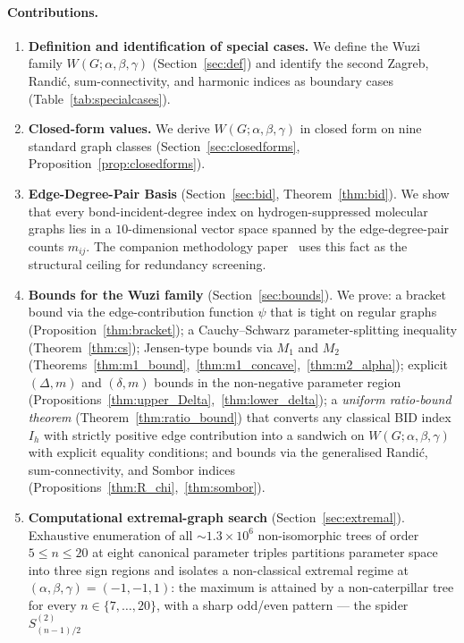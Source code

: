 \documentclass[11pt,a4paper]{article}
\theoremstyle{definition}
\newcommand{\Wuzi}{W(G;\alpha,\beta,\gamma)}
\begin{document}
\paragraph{Contributions.}
\begin{enumerate}[label=(\arabic*)]
\item \textbf{Definition and identification of special cases.}
We define the Wuzi family $\Wuzi$ (Section~\ref{sec:def}) and
identify the second Zagreb, Randi\'c, sum-connectivity, and harmonic
indices as boundary cases (Table~\ref{tab:specialcases}).
\item \textbf{Closed-form values.} We derive $\Wuzi$ in closed form
on nine standard graph classes (Section~\ref{sec:closedforms},
Proposition~\ref{prop:closedforms}).
\item \textbf{Edge-Degree-Pair Basis} (Section~\ref{sec:bid},
Theorem~\ref{thm:bid}). We show that every bond-incident-degree
index on hydrogen-suppressed molecular graphs lies in a
$10$-dimensional vector space spanned by the edge-degree-pair
counts $m_{ij}$. The companion methodology
paper~\cite{Paper2_Screening} uses this fact as the structural
ceiling for redundancy screening.
\item \textbf{Bounds for the Wuzi family} (Section~\ref{sec:bounds}).
We prove: a bracket bound via the edge-contribution function $\psi$
that is tight on regular graphs (Proposition~\ref{thm:bracket}); a
Cauchy--Schwarz parameter-splitting inequality
(Theorem~\ref{thm:cs}); Jensen-type bounds via $M_1$ and $M_2$
(Theorems~\ref{thm:m1_bound},~\ref{thm:m1_concave},~\ref{thm:m2_alpha});
explicit $(\Delta, m)$ and $(\delta, m)$ bounds in the non-negative
parameter region
(Propositions~\ref{thm:upper_Delta},~\ref{thm:lower_delta}); a
\emph{uniform ratio-bound theorem} (Theorem~\ref{thm:ratio_bound})
that converts any classical BID index $I_h$ with strictly positive
edge contribution into a sandwich on $\Wuzi$ with explicit equality
conditions; and bounds via the generalised Randi\'c, sum-connectivity,
and Sombor indices
(Propositions~\ref{thm:R_chi},~\ref{thm:sombor}).
\item \textbf{Computational extremal-graph search}
(Section~\ref{sec:extremal}). Exhaustive enumeration of all
$\sim 1.3 \times 10^{6}$ non-isomorphic trees of order
$5 \le n \le 20$ at eight canonical parameter triples partitions
parameter space into three sign regions and isolates a
non-classical extremal regime at
$(\alpha, \beta, \gamma) = (-1, -1, 1)$: the maximum is attained
by a non-caterpillar tree for every $n \in \{7, \ldots, 20\}$,
with a sharp odd/even pattern --- the spider $S^{(2)}_{(n-1)/2}$

\end{enumerate}
\end{document}
